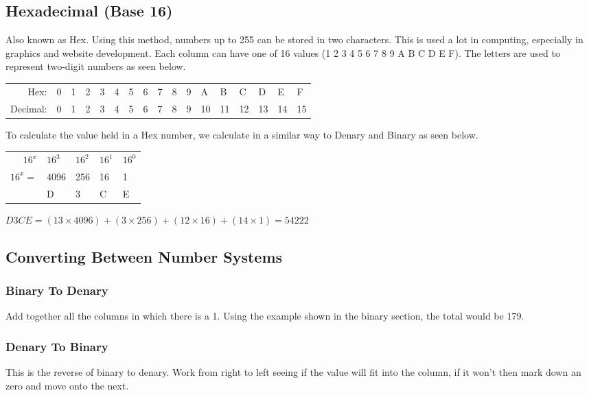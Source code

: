 \subsection*{Hexadecimal (Base 16)}
Also known as Hex. Using this method, numbers up to 255 can be stored in two characters. This is used a lot in computing, especially in graphics and website development. Each column can have one of 16 values (1 2 3 4 5 6 7 8 9 A B C D E F). The letters are used to represent two-digit numbers as seen below.
\begin{table}[H]
    \centering
    \begin{tabularx}{0.8\linewidth}{rXXXXXXXXXXXXXXXX}
        Hex: & 0 & 1 & 2 & 3 & 4 & 5 & 6 & 7 & 8 & 9 & A & B & C & D & E & F \\
        Decimal: & 0 & 1 & 2 & 3 & 4 & 5 & 6 & 7 & 8 & 9 & 10 & 11 & 12 & 13 & 14 & 15
    \end{tabularx}
\end{table}
To calculate the value held in a Hex number, we calculate in a similar way to Denary and Binary as seen below.
\begin{table}[H]
    \centering
    \begin{tabularx}{0.5\linewidth}{r||X|X|X|X}
        $16^{x}$ & $16^3$ & $16^2$ & $16^1$ & $16^0$\\
        $16^{x}=$ & 4096 & 256 & 16 & 1\\
        \hline
        & D & 3 & C & E
    \end{tabularx}
\end{table}
$D3CE = (13 \times 4096) + (3 \times 256) + (12 \times 16) + (14 \times 1) = 54222$


\subsection*{Converting Between Number Systems}
\subsubsection*{Binary To Denary}
Add together all the columns in which there is a 1. Using the example shown in the binary section, the total would be 179.
\subsubsection*{Denary To Binary}
This is the reverse of binary to denary. Work from right to left seeing if the value will fit into the column, if it won't then mark down an zero and move onto the next.
